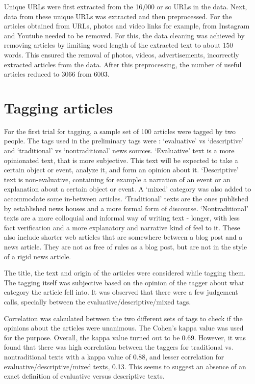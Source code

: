 \documentclass[11pt]{article}
\begin{document}
Unique URLs were first extracted from the 16,000 or so URLs in the data. Next, data from these unique URLs was extracted and then preprocessed. For the articles obtained from URLs, photos and video links for example, from Instagram and Youtube needed to be removed. For this, the data cleaning was achieved by removing articles by limiting word length of the extracted text to about 150 words. This ensured the removal of photos, videos, advertisements, incorrectly extracted articles from the data.  After this preprocessing, the number of useful articles reduced to 3066 from 6003.

\section {Tagging articles}

For the first trial for tagging, a sample set of 100 articles were tagged by two people. The tags used in the preliminary tags were : ‘evaluative’ vs ‘descriptive’ and ‘traditional’ vs ‘nontraditional’ news sources. ‘Evaluative’ text is a more opinionated text, that is more subjective. This text will be expected to take a certain object or event, analyze it,  and form an opinion about it. ‘Descriptive’ text is non-evaluative, containing for example a narration of an event or an explanation about a certain object or event. A ‘mixed’ category was also added to accommodate some in-between articles. ‘Traditional’ texts are the ones published by established news houses and a more formal form of discourse. ‘Nontraditional’ texts are a more colloquial and informal way of writing text - longer, with less fact verification and a more explanatory and narrative kind of feel to it. These also include shorter web articles that are somewhere between a blog post and a news article. They are not as free of rules as a blog post, but are not in the style of a rigid news article.

The title, the text and origin of the articles were considered while tagging them. The tagging itself was subjective based on the opinion of the tagger about what category the article fell into. It was observed that there were a few judgement calls, specially between the evaluative/descriptive/mixed tags.

Correlation was calculated between the two different sets of tags to check if the opinions about the articles were unanimous. The Cohen’s kappa value was used for the purpose. Overall, the kappa value turned out to be 0.69. However, it was found that there was high correlation between the taggers for traditional vs. nontraditional texts with a kappa value of 0.88, and lesser correlation for evaluative/descriptive/mixed texts, 0.13. This seems to suggest an absence of an exact definition of evaluative versus descriptive texts. 
\end{document}
